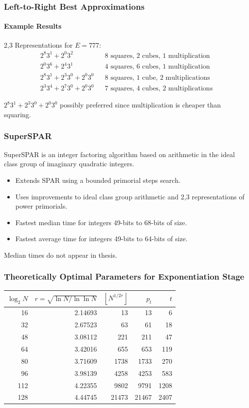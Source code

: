 \documentclass{beamer}
\newcommand{\floor}[1]{\left\lfloor #1 \right\rfloor}
\newcommand{\smallfont}{\fontsize{6pt}{7.2}\selectfont}
\begin{document}
\begin{frame}
\frametitle{Left-to-Right Best Approximations}
\framesubtitle{Example Results}
2,3 Representations for $E=777$:
\begin{align*}
2^8 3^1 + 2^0 3^2 && \textrm{8 squares, 2 cubes, 1 multiplication} \\
2^0 3^6 + 2^4 3^1 && \textrm{4 squares, 6 cubes, 1 multiplication} \\
2^8 3^1 + 2^3 3^0 + 2^0 3^0 && \textrm{8 squares, 1 cube, 2 multiplications} \\
2^3 3^4 + 2^7 3^0 + 2^0 3^0 && \textrm{7 squares, 4 cubes, 2 multiplications}
\end{align*}

\bigskip
$2^8 3^1 + 2^3 3^0 + 2^0 3^0$ possibly preferred since multiplication is cheaper than squaring.
\end{frame}


\begin{frame}
\frametitle{SuperSPAR}
SuperSPAR is an integer factoring algorithm based on arithmetic in the ideal class group of imaginary quadratic integers.
\begin{itemize}
\item Extends SPAR using a bounded primorial steps search.
\item Uses improvements to ideal class group arithmetic and 2,3 representations of power primorials.
\item Fastest median time for integers 49-bits to 68-bits of size.
\item Fastest average time for integers 49-bits to 64-bits of size.
\end{itemize}
\bigbreak
\smallfont
Median times do not appear in thesis.
\end{frame}

\begin{frame}
\frametitle{Theoretically Optimal Parameters for Exponentiation Stage}
\begin{table}
\centering
\begin{tabular}{| r | r | r | r | r |}
\hline
$\log_2 N$ & $r = \sqrt{\ln N / \ln \ln N}$ & $\floor{N^{1/2r}}$ & $p_t$ & $t$ \\
\hline
16 & 2.14693 & 13 & 13 & 6 \\
32 & 2.67523 & 63 & 61 & 18 \\
48 & 3.08112 & 221 & 211 & 47 \\
64 & 3.42016 & 655 & 653 & 119 \\
80 & 3.71609 & 1738 & 1733 & 270 \\
96 & 3.98139 & 4258 & 4253 & 583 \\
112 & 4.22355 & 9802 & 9791 & 1208 \\
128 & 4.44745 & 21473 & 21467 & 2407 \\
\hline
\end{tabular}
\end{table}
\end{frame}
\end{document}
